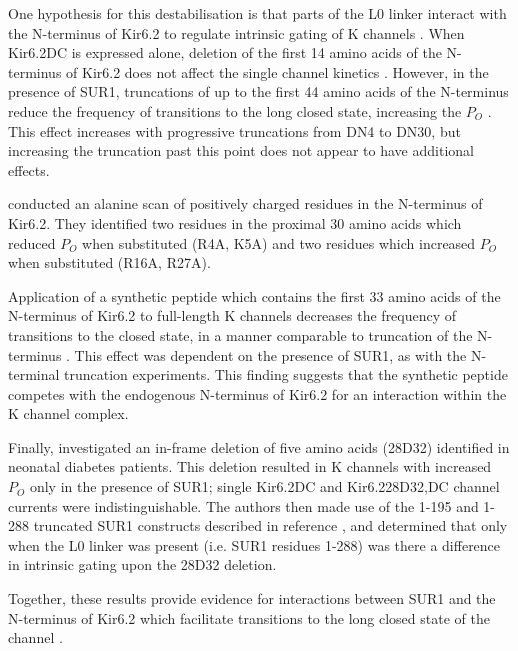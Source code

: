 One hypothesis for this destabilisation is that parts of the L0 linker interact with the N-terminus of Kir6.2 to regulate intrinsic gating of K\ATP{} channels \cite{koster_atp_1999, babenko_n-terminus_1999, reimann_involvement_1999-1, babenko_sur-dependent_2002}.
When Kir6.2\textgreek{D}C is expressed alone, deletion of the first 14 amino acids of the N-terminus of Kir6.2 does not affect the single channel kinetics \cite{reimann_involvement_1999-1}.
However, in the presence of SUR1, truncations of up to the first 44 amino acids of the N-terminus reduce the frequency of transitions to the long closed state, increasing the $P_O$ \cite{reimann_involvement_1999-1, koster_atp_1999, babenko_n-terminus_1999}.
This effect increases with progressive truncations from \textgreek{D}N4 to \textgreek{D}N30, but increasing the truncation past this point does not appear to have additional effects.

\citeauthor{cukras_role_2002} conducted an alanine scan of positively charged residues in the N-terminus of Kir6.2.
They identified two residues in the proximal 30 amino acids which reduced $P_O$ when substituted (R4A, K5A) and two residues which increased $P_O$ when substituted (R16A, R27A).

Application of a synthetic peptide which contains the first 33 amino acids of the N-terminus of Kir6.2 to full-length K\ATP{} channels decreases the frequency of transitions to the closed state, in a manner comparable to truncation of the N-terminus \cite{babenko_sur-dependent_2002}.
This effect was dependent on the presence of SUR1, as with the N-terminal truncation experiments.
This finding suggests that the synthetic peptide competes with the endogenous N-terminus of Kir6.2 for an interaction within the K\ATP{} channel complex.

Finally, \citeauthor{craig_-frame_2009} investigated an in-frame deletion of five amino acids (28\textgreek{D}32) identified in neonatal diabetes patients.
This deletion resulted in K\ATP{} channels with increased $P_O$ only in the presence of SUR1; single Kir6.2\textgreek{D}C and Kir6.228\textgreek{D}32,\textgreek{D}C channel currents were indistinguishable.
The authors then made use of the 1-195 and 1-288 truncated SUR1 constructs described in reference \cite{babenko_sur_2003}, and determined that only when the L0 linker was present (i.e. SUR1 residues 1-288) was there a difference in intrinsic gating upon the 28\textgreek{D}32 deletion.

Together, these results provide evidence for interactions between SUR1 and the N-terminus of Kir6.2 which facilitate transitions to the long closed state of the channel \cite{babenko_sur_2003}.

